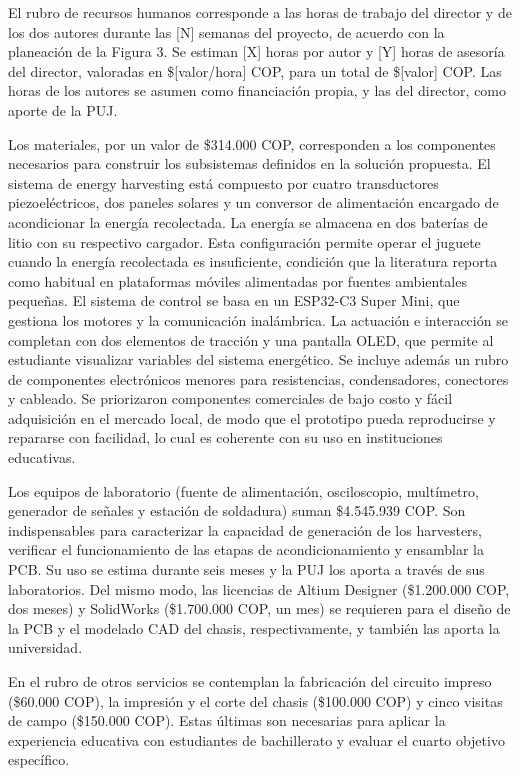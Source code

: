 \documentclass[11pt]{article}
\begin{document}
El rubro de recursos humanos corresponde a las horas de trabajo del director y de los dos autores durante las [N] semanas del proyecto, de acuerdo con la planeación de la Figura 3. Se estiman [X] horas por autor y [Y] horas de asesoría del director, valoradas en \$[valor/hora] COP, para un total de \$[valor] COP. Las horas de los autores se asumen como financiación propia, y las del director, como aporte de la PUJ.

Los materiales, por un valor de \$314.000 COP, corresponden a los componentes necesarios para construir los subsistemas definidos en la solución propuesta. El sistema de energy harvesting está compuesto por cuatro transductores piezoeléctricos, dos paneles solares y un conversor de alimentación encargado de acondicionar la energía recolectada. La energía se almacena en dos baterías de litio con su respectivo cargador. Esta configuración permite operar el juguete cuando la energía recolectada es insuficiente, condición que la literatura reporta como habitual en plataformas móviles alimentadas por fuentes ambientales pequeñas. El sistema de control se basa en un ESP32-C3 Super Mini, que gestiona los motores y la comunicación inalámbrica. La actuación e interacción se completan con dos elementos de tracción y una pantalla OLED, que permite al estudiante visualizar variables del sistema energético. Se incluye además un rubro de componentes electrónicos menores para resistencias, condensadores, conectores y cableado. Se priorizaron componentes comerciales de bajo costo y fácil adquisición en el mercado local, de modo que el prototipo pueda reproducirse y repararse con facilidad, lo cual es coherente con su uso en instituciones educativas.

Los equipos de laboratorio (fuente de alimentación, osciloscopio, multímetro, generador de señales y estación de soldadura) suman \$4.545.939 COP. Son indispensables para caracterizar la capacidad de generación de los harvesters, verificar el funcionamiento de las etapas de acondicionamiento y ensamblar la PCB. Su uso se estima durante seis meses y la PUJ los aporta a través de sus laboratorios. Del mismo modo, las licencias de Altium Designer (\$1.200.000 COP, dos meses) y SolidWorks (\$1.700.000 COP, un mes) se requieren para el diseño de la PCB y el modelado CAD del chasis, respectivamente, y también las aporta la universidad.

En el rubro de otros servicios se contemplan la fabricación del circuito impreso (\$60.000 COP), la impresión y el corte del chasis (\$100.000 COP) y cinco visitas de campo (\$150.000 COP). Estas últimas son necesarias para aplicar la experiencia educativa con estudiantes de bachillerato y evaluar el cuarto objetivo específico.
\end{document}
